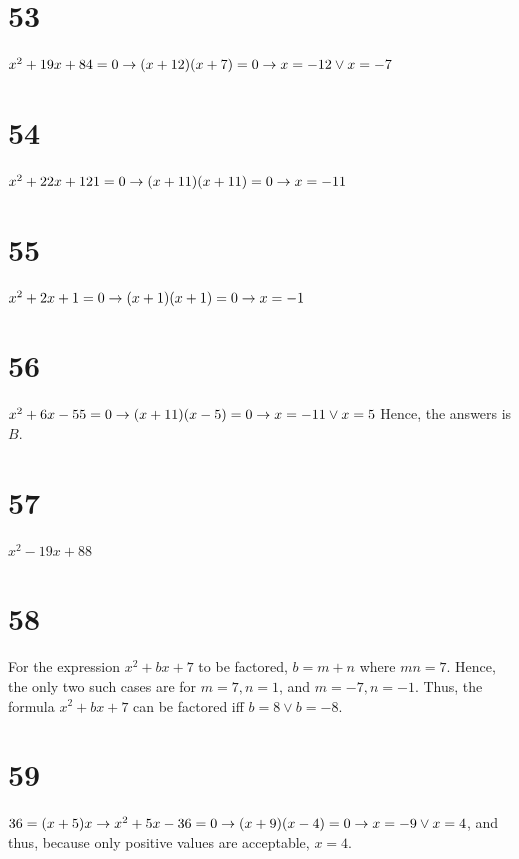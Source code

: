 \documentclass{article}
\theoremstyle{definition}
\begin{document}
\section*{53}
$x^2+19x+84=0\newline\rightarrow (x+12)(x+7)=0\newline\rightarrow x=-12\vee x=-7$

\section*{54}
$x^2+22x+121=0\newline\rightarrow (x+11)(x+11)=0\newline\rightarrow x=-11$

\section*{55}
$x^2+2x+1=0\newline\rightarrow (x+1)(x+1)=0\newline\rightarrow x=-1$

\section*{56}
$x^2+6x-55=0\newline\rightarrow (x+11)(x-5)=0\newline\rightarrow x=-11\vee x=5$ Hence, the answers is $B$.

\section*{57}
$x^2-19x+88$

\section*{58}
For the expression $x^2+bx+7$ to be factored, $b=m+n$ where $mn=7$. Hence, the only two such cases are for $m=7, n=1$, and $m=-7, n=-1$. Thus, 
the formula $x^2+bx+7$ can be factored iff $b=8\vee b=-8$.

\section*{59}
$36=(x+5)x\newline\rightarrow x^2+5x-36=0\newline\rightarrow (x+9)(x-4)=0\newline\rightarrow x=-9\vee x=4$, and thus, because only positive values are 
acceptable, $x=4$.
\end{document}
